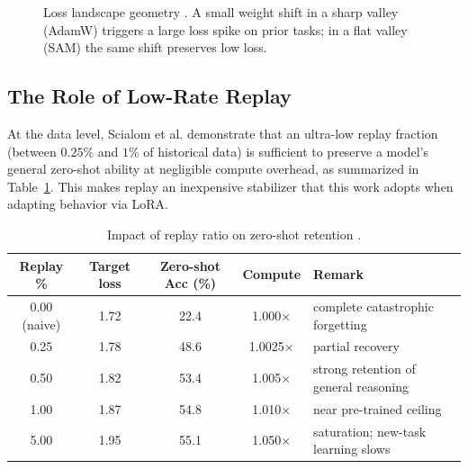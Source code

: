 \begin{figure}[H]
\centering
{}
\caption{Loss landscape geometry \parencite{li2024revisitingcatastrophicforgettinglarge}. A small weight shift in a sharp valley (AdamW) triggers a large loss spike on prior tasks; in a flat valley (SAM) the same shift preserves low loss.}
\label{fig:loss_landscape}
\end{figure}

\subsection{The Role of Low-Rate Replay}
At the data level, Scialom et al. \parencite{scialom-etal-2022-fine} demonstrate that an ultra-low replay fraction (between $0.25\%$ and $1\%$ of historical data) is sufficient to preserve a model's general zero-shot ability at negligible compute overhead, as summarized in Table~\ref{tab:replay_ratio}. This makes replay an inexpensive stabilizer that this work adopts when adapting behavior via LoRA.

\begin{table}[H]
\centering
\small
\caption{Impact of replay ratio on zero-shot retention \parencite{scialom-etal-2022-fine}.}
\label{tab:replay_ratio}
\begin{tabularx}{\textwidth}{c c c c X}
\hline
\textbf{Replay \%} & \textbf{Target loss} & \textbf{Zero-shot Acc (\%)} & \textbf{Compute} & \textbf{Remark} \\
\hline
0.00 (naive) & 1.72 & 22.4 & 1.000$\times$ & complete catastrophic forgetting \\
0.25 & 1.78 & 48.6 & 1.0025$\times$ & partial recovery \\
0.50 & 1.82 & 53.4 & 1.005$\times$ & strong retention of general reasoning \\
1.00 & 1.87 & 54.8 & 1.010$\times$ & near pre-trained ceiling \\
5.00 & 1.95 & 55.1 & 1.050$\times$ & saturation; new-task learning slows \\
\hline
\end{tabularx}
\end{table}

